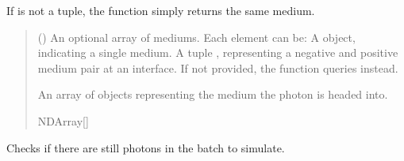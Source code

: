 \documentclass[letterpaper,10pt,english]{sphinxmanual}
\begin{document}
\begin{fulllineitems}
\begin{fulllineitems}
\sphinxAtStartPar
If  is not a tuple, the function simply returns the same medium.
\begin{quote}\begin{description}
\sphinxAtStartPar
{} (\sphinxstyleliteralemphasis{\sphinxupquote{{[}}}{\hyperref[\detokenize{generated/photon_canon.optics:photon_canon.optics.Medium}]{\sphinxcrossref{\sphinxstyleliteralemphasis{\sphinxupquote{Medium}}}}}\sphinxstyleliteralemphasis{\sphinxupquote{ | }}\sphinxstyleliteralemphasis{\sphinxupquote{{[}}}{\hyperref[\detokenize{generated/photon_canon.optics:photon_canon.optics.Medium}]{\sphinxcrossref{\sphinxstyleliteralemphasis{\sphinxupquote{Medium}}}}}\sphinxstyleliteralemphasis{\sphinxupquote{{]}}}\sphinxstyleliteralemphasis{\sphinxupquote{{]}}}\sphinxstyleliteralemphasis{\sphinxupquote{, }}) \textendash{} An optional array of mediums. Each element can be:
\sphinxhyphen{} A  object, indicating a single medium.
\sphinxhyphen{} A tuple , representing a negative and positive medium pair at an interface.
If not provided, the function queries  instead.

\sphinxAtStartPar
An array of  objects representing the medium the photon is headed into.

\sphinxAtStartPar
NDArray{[}{\hyperref[\detokenize{generated/photon_canon.optics:photon_canon.optics.Medium}]{}}{]}

\end{description}\end{quote}

\end{fulllineitems}


\begin{fulllineitems}
\label{\detokenize{generated/photon_canon.optics:photon_canon.optics.Photon.is_terminated}}
\pysigstartsignatures
\pysigline
{}
\pysigstopsignatures
\sphinxAtStartPar
Checks if there are still photons in the batch to simulate.


\end{fulllineitems}
\end{fulllineitems}
\end{document}
